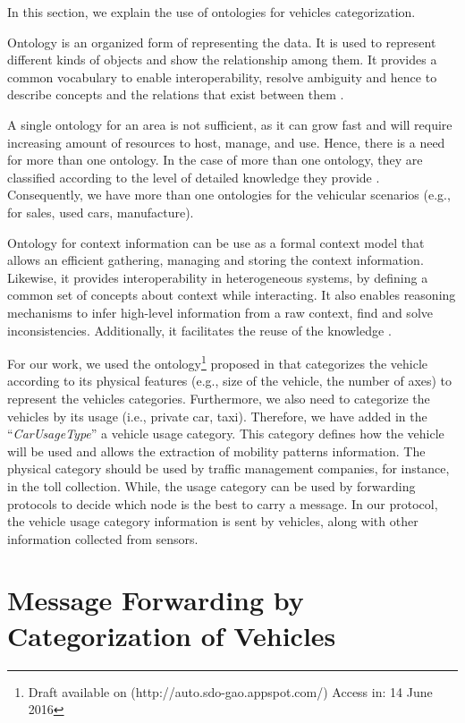 \documentclass[letterpaper, 10 pt, conference]{ieeeconf}  %
\begin{document}
In this section, we explain the use of ontologies for vehicles categorization.

Ontology is an organized form of representing the data. It is used to represent different kinds of objects and show the relationship among them. It provides a common vocabulary to enable interoperability, resolve ambiguity and hence to describe concepts and the relations that exist between them \cite{madkour2011}.

A single ontology for an area is not sufficient, as it can grow fast and will require increasing amount of resources to host, manage, and use. Hence, there is a need for more than one ontology. In the case of more than one ontology, they are classified according to the level of detailed knowledge they provide \cite{packer2010}. Consequently, we have more than one ontologies for the vehicular scenarios (e.g., for sales, used cars, manufacture).

Ontology for context information can be use as a formal context model that allows an efficient gathering, managing and storing the context information. Likewise, it provides interoperability in heterogeneous systems, by defining a common set of concepts about context while interacting. It also enables reasoning mechanisms to infer high-level information from a raw context, find and solve inconsistencies. Additionally, it facilitates the reuse of the knowledge \cite{serrano2007}.

For our work, we used the ontology\footnote{Draft available on (http://auto.sdo-gao.appspot.com/) Access in: 14 June 2016} proposed in \cite{gao_2016} that categorizes the vehicle according to its physical features (e.g., size of the vehicle, the number of axes) to represent the vehicles categories. Furthermore, we also need to categorize the vehicles by its usage (i.e., private car, taxi). Therefore, we have added in the ``\emph{CarUsageType}'' a vehicle usage category. This category defines how the vehicle will be used and allows the extraction of mobility patterns information. The physical category should be used by traffic management companies, for instance, in the toll collection. While, the usage category can be used by forwarding protocols to decide which node is the best to carry a message. In our protocol, the vehicle usage category information is sent by vehicles, along with other information collected from sensors.

\section{Message Forwarding by Categorization of Vehicles}
\end{document}
